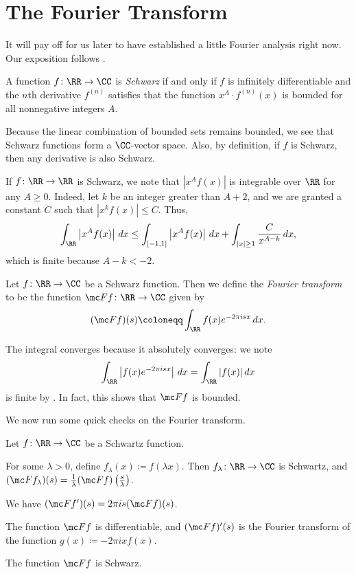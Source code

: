 \documentclass[notes.tex]{subfiles}
\begin{document}
\section{The Fourier Transform}
It will pay off for us later to have established a little Fourier analysis right now. Our exposition follows \cite[Chapter~5]{stein-fourier-analysis}.
\begin{definition}[Schwarz]
	A function $f\colon\RR\to\CC$ is \textit{Schwarz} if and only if $f$ is infinitely differentiable and the $n$th derivative $f^{(n)}$ satisfies that the function $x^A\cdot f^{(n)}(x)$ is bounded for all nonnegative integers $A$.
\end{definition}
\begin{remark} \label{rem:build-schwarz-functions}
	Because the linear combination of bounded sets remains bounded, we see that Schwarz functions form a $\CC$-vector space. Also, by definition, if $f$ is Schwarz, then any derivative is also Schwarz.
\end{remark}
\begin{remark} \label{rem:integrate-schwarz}
	If $f\colon\RR\to\RR$ is Schwarz, we note that $\left|x^Af(x)\right|$ is integrable over $\RR$ for any $A\ge0$. Indeed, let $k$ be an integer greater than $A+2$, and we are granted a constant $C$ such that $\left|x^kf(x)\right|\le C$. Thus,
	\[\int_\RR\left|x^Af(x)\right|\,dx\le\int_{[-1,1]}\left|x^Af(x)\right|\,dx+\int_{|x|\ge1}\frac C{x^{A-k}}\,dx,\]
	which is finite because $A-k<-2$.
\end{remark}
\begin{definition}
	Let $f\colon\RR\to\CC$ be a Schwarz function. Then we define the \textit{Fourier transform} to be the function $\mc Ff\colon\RR\to\CC$ given by
	\[(\mc Ff)(s)\coloneqq\int_\RR f(x)e^{-2\pi isx}\,dx.\]
\end{definition}
\begin{remark} \label{rem:fourier-transform-converges}
	The integral converges because it absolutely converges: we note
	\[\int_\RR\left|f(x)e^{-2\pi isx}\right|\,dx=\int_\RR|f(x)|\,dx\]
	is finite by . In fact, this shows that $\mc Ff$ is bounded.
\end{remark}
We now run some quick checks on the Fourier transform.
\begin{lemma} \label{lem:fourier-checks}
	Let $f\colon\RR\to\CC$ be a Schwartz function.
	\begin{listalph}
		\item For some $\lambda>0$, define $f_\lambda(x)\coloneqq f(\lambda x)$. Then $f_\lambda\colon\RR\to\CC$ is Schwartz, and $(\mc Ff_\lambda)(s)=\frac1\lambda(\mc Ff)\left(\frac s\lambda\right)$.
		\item We have $(\mc Ff')(s)=2\pi is(\mc Ff)(s)$.
		\item The function $\mc Ff$ is differentiable, and $(\mc Ff)'(s)$ is the Fourier transform of the function $g(x)\coloneqq-2\pi ixf(x)$.
		\item The function $\mc Ff$ is Schwarz.
	\end{listalph}
\end{lemma}
\end{document}
